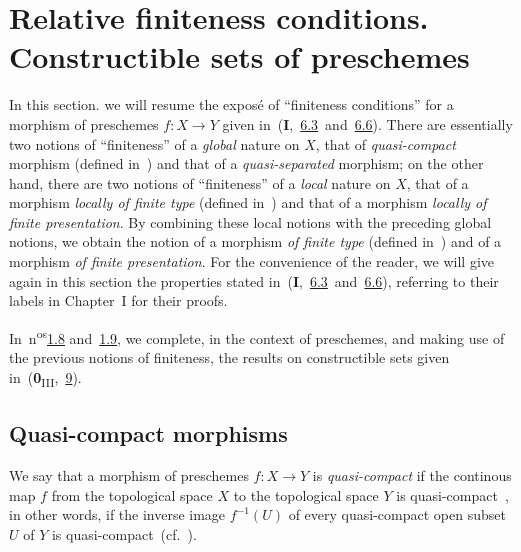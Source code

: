 \section{Relative finiteness conditions. Constructible sets of preschemes}
\label{section:relative-finiteness-conditions-constructible-sets-of-preschemes}

In this section. we will resume the expos\'e of ``finiteness conditions'' for a morphism of preschemes $f:X\to Y$ given in~(\textbf{I},~\hyperref[subsection:1.6.3]{6.3}~and~\hyperref[subsection:1.6.6]{6.6}).
There are essentially two notions of ``finiteness'' of a \emph{global} nature on $X$, that of \emph{quasi-compact} morphism (defined in~) and that of a \emph{quasi-separated} morphism; on the other hand, there are two notions of ``finiteness'' of a \emph{local} nature on $X$, that of a morphism \emph{locally of finite type} (defined in~) and that of a morphism \emph{locally of finite presentation}.
By combining these local notions with the preceding global notions, we obtain the notion of a morphism \emph{of finite type} (defined in~) and of a morphism \emph{of finite presentation}.
For the convenience of the reader, we will give again in this section the properties stated in~(\textbf{I},~\hyperref[subsection:1.6.3]{6.3}~and~\hyperref[subsection:1.6.6]{6.6}), referring to their labels in Chapter~I for their proofs.

In~n\textsuperscript{os}\hyperref[subsection:4.1.8]{1.8} and~\hyperref[subsection:4.1.9]{1.9}, we complete, in the context of preschemes, and making use of the previous notions of finiteness, the results on constructible sets given in~(\textbf{0}\textsubscript{III},~\textsection\hyperref[section:1.9]{9}).

\subsection{Quasi-compact morphisms}
\label{subsection:quasi-compact-morphisms}

\begin{defn}[1.1.1]
\label{4.1.1.1}
We say that a morphism of preschemes $f:X\to Y$ is \emph{quasi-compact} if the continous map $f$ from the topological space $X$ to the topological space $Y$ is quasi-compact~, in other words, if the inverse image $f^{-1}(U)$ of every quasi-compact open subset $U$ of $Y$ is quasi-compact~(cf.~).
\end{defn}

